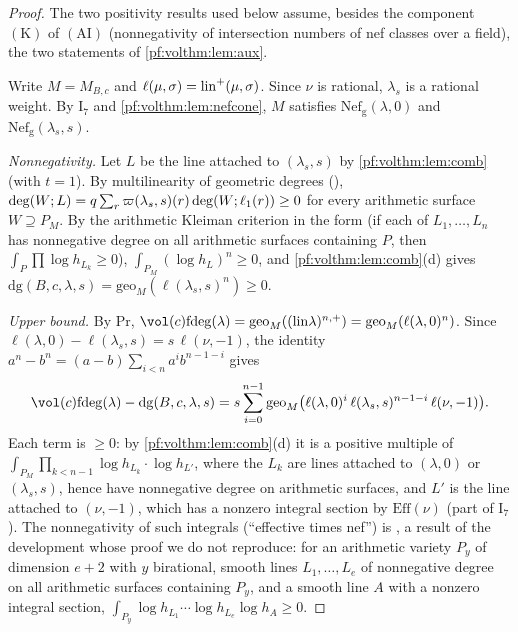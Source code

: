 \begin{proof}
The two positivity results used below assume, besides the component $(\mathrm{K})$ of
$(\mathrm{AI})$ (nonnegativity of intersection numbers of nef classes over a field), the two statements
of \cref{pf:volthm:lem:aux}.

Write $M=M_{B,c}$ and $\ell(\mu,\sigma)=\mathrm{lin}^+(\mu,\sigma)$. Since $\nu$ is rational, $\lambda_s$ is a
rational weight. By $\mathrm{I}_7$ and \cref{pf:volthm:lem:nefcone}, $M$ satisfies $\mathrm{Nef}_{\mathrm g}(\lambda,0)$
and $\mathrm{Nef}_{\mathrm g}(\lambda_s,s)$.

\emph{Nonnegativity.} Let $L$ be the line attached to $(\lambda_s,s)$ by \cref{pf:volthm:lem:comb} (with $t=1$).
By multilinearity of geometric degrees
(), $\deg(W;L)=q\sum_r\varpi(\lambda_s,s)(r)
\deg(W;\ell_1(r))\ge0$ for every arithmetic surface $W\supseteq P_M$. By the arithmetic Kleiman criterion in the
form  (if each of $L_1,\dots,L_n$ has nonnegative degree on
all arithmetic surfaces containing $P$, then $\int_P\prod\log h_{L_k}\ge0$), $\int_{P_M}(\log h_L)^n\ge0$, and
\cref{pf:volthm:lem:comb}(d) gives $\mathrm{dg}(B,c,\lambda,s)=\mathrm{geo}_M(\ell(\lambda_s,s)^n)\ge0$.

\emph{Upper bound.} By $\mathrm{Pr}$,
$\vol(c)\volthmfd(\lambda)=\mathrm{geo}_M((\volthmlin\lambda)^{n,+})=\mathrm{geo}_M(\ell(\lambda,0)^n)$. Since
$\ell(\lambda,0)-\ell(\lambda_s,s)=s\,\ell(\nu,-1)$, the identity
$a^n-b^n=(a-b)\sum_{i<n}a^ib^{n-1-i}$ gives
\[
\vol(c)\volthmfd(\lambda)-\mathrm{dg}(B,c,\lambda,s)=s\sum_{i=0}^{n-1}
\mathrm{geo}_M\bigl(\ell(\lambda,0)^i\,\ell(\lambda_s,s)^{n-1-i}\,\ell(\nu,-1)\bigr).
\]
Each term is $\ge0$: by \cref{pf:volthm:lem:comb}(d) it is a positive multiple of
$\int_{P_M}\prod_{k<n-1}\log h_{L_k}\cdot\log h_{L'}$, where the $L_k$ are lines attached to $(\lambda,0)$ or
$(\lambda_s,s)$, hence have nonnegative degree on arithmetic surfaces, and $L'$ is the line attached to
$(\nu,-1)$, which has a nonzero integral section by $\mathrm{Eff}(\nu)$ (part of $\mathrm{I}_7$). The
nonnegativity of such integrals (``effective times nef'') is
, a result of the development whose proof we do not
reproduce: for an arithmetic variety $P_y$ of dimension $e+2$ with $y$ birational, smooth lines
$L_1,\dots,L_e$ of nonnegative degree on all arithmetic surfaces containing $P_y$, and a smooth line $A$ with a
nonzero integral section, $\int_{P_y}\log h_{L_1}\cdots\log h_{L_e}\log h_A\ge0$.
\end{proof}

